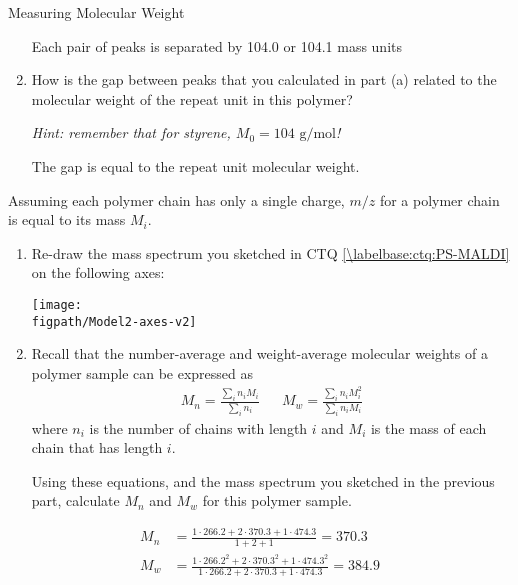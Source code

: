 \begin{activity}{Measuring Molecular Weight}
\begin{ctqs}
\begin{enumerate}
				\begin{solution}[0.75in]
					Each pair of peaks is separated by 104.0 or 104.1 mass units
				\end{solution}
			
			\item How is the gap between peaks that you calculated in part (a) related to the molecular weight of the repeat unit in this polymer?
			
				\emph{Hint: remember that for styrene, $M_0 = 104\text{ g/mol}$!}
			
				\begin{solution}[0.75in]
					The gap is equal to the repeat unit molecular weight.
				\end{solution}
			
		\end{enumerate}
		
	\question Assuming each polymer chain has only a single charge, $m/z$ for a polymer chain is equal to its mass $M_i$.
	
		\begin{enumerate}
			\item Re-draw the mass spectrum you sketched in CTQ \ref{\labelbase:ctq:PS-MALDI} on the following axes:
		
			\vspace{12pt}
			\centerline{\texttt{[image: \\figpath/Model2-axes-v2]}}
			
			\item Recall that the number-average and weight-average molecular weights of a polymer sample can be expressed as
		\begin{align*}
			M_n = \frac{\sum_i n_i M_i}{\sum_i n_i} && M_w = \frac{\sum_i n_i M_i^2}{\sum_i n_i M_i}
		\end{align*}
		where $n_i$ is the number of chains with length $i$ and $M_i$ is the mass of each chain that has length $i$.
		
				Using these equations, and the mass spectrum you sketched in the previous part, calculate $M_n$ and $M_w$ for this polymer sample.
		\end{enumerate}
		
		\begin{solution}[3.5in]
			\begin{align*}
				M_n &= \frac{1\cdot 266.2 + 2\cdot 370.3 + 1\cdot 474.3}{1 + 2 + 1} = 370.3\\
				M_w &= \frac{1\cdot 266.2^2 + 2\cdot 370.3^2 + 1\cdot 474.3^2}{1\cdot 266.2 + 2\cdot 370.3 + 1\cdot 474.3} = 384.9
			\end{align*}
		\end{solution}
		

\end{ctqs}
\end{activity}
